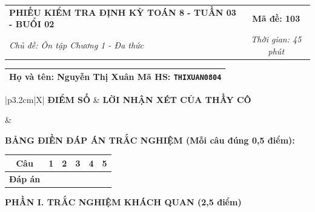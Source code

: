 \documentclass[12pt,a4paper]{article}
\begin{document}
\newpage


\noindent
\begin{tabularx}{\linewidth}{|X|c|}
\hline
\textbf{PHIẾU KIỂM TRA ĐỊNH KỲ TOÁN 8 - TUẦN 03 - BUỔI 02} & \textbf{Mã đề: 103} \\
\textit{Chủ đề: Ôn tập Chương 1 - Đa thức} & \textit{Thời gian: 45 phút} \\
\hline
\end{tabularx}

\vspace{1mm}

\noindent
\begin{tabularx}{\linewidth}{|X|}
\hline
\rule[-2mm]{0pt}{7.5mm}\textbf{Họ và tên:} \textbf{\large Nguyễn Thị Xuân} \hfill \textbf{Mã HS:} \texttt{THIXUAN0804} \quad \\
\hline
\end{tabularx}

\vspace{1mm}

\noindent
\begin{tabularx}{\linewidth}{|p{3.2cm}|X|}
\hline
\centering\textbf{ĐIỂM SỐ} & \centering\textbf{LỜI NHẬN XÉT CỦA THẦY CÔ} \tabularnewline
\hline
\rule{0pt}{1.3cm} & \tabularnewline
\hline
\end{tabularx}

\vspace{1.2mm}

\noindent\textbf{BẢNG ĐIỀN ĐÁP ÁN TRẮC NGHIỆM (Mỗi câu đúng 0,5 điểm):}
\vspace{0.8mm}

\noindent
\renewcommand{\arraystretch}{1.35}
\begin{tabularx}{\linewidth}{|c|*{5}{>{\centering\arraybackslash}X|}}
\hline
\textbf{Câu} & \textbf{1} & \textbf{2} & \textbf{3} & \textbf{4} & \textbf{5} \\
\hline
\textbf{Đáp án} & & & & & \\
\hline
\end{tabularx}
\renewcommand{\arraystretch}{1.0}

\vspace{1.5mm}

\noindent\textbf{\large PHẦN I. TRẮC NGHIỆM KHÁCH QUAN (2,5 điểm)}
\vspace{1mm}
\end{document}
